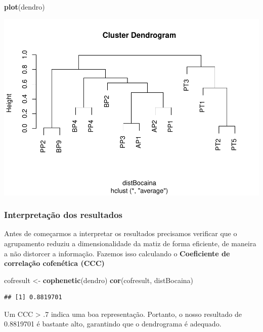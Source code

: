 \documentclass[
]{book}
\newenvironment{Shaded}{\begin{snugshade}}{\end{snugshade}}
\newcommand{\KeywordTok}[1]{\textcolor[rgb]{0.13,0.29,0.53}{\textbf{#1}}}
\newcommand{\NormalTok}[1]{#1}
\newcommand{\StringTok}[1]{\textcolor[rgb]{0.31,0.60,0.02}{#1}}
\begin{document}
\begin{Shaded}
\begin{Highlighting}[]
\KeywordTok{plot}\NormalTok{(dendro)}
\end{Highlighting}
\end{Shaded}

\includegraphics{livro_r_ecologia_files/figure-latex/unnamed-chunk-25-1.pdf}

\hypertarget{interpretauxe7uxe3o-dos-resultados}{%
\subsubsection{Interpretação dos resultados}\label{interpretauxe7uxe3o-dos-resultados}}

Antes de começarmos a interpretar os resultados precisamos verificar que o agrupamento reduziu a dimensionalidade da matiz de forma eficiente, de maneira a não distorcer a informação. Fazemos isso calculando o \textbf{Coeficiente de correlação cofenética (CCC)}

\begin{Shaded}
\begin{Highlighting}[]
\NormalTok{cofresult <-}\StringTok{ }\KeywordTok{cophenetic}\NormalTok{(dendro)}
\KeywordTok{cor}\NormalTok{(cofresult, distBocaina)}
\end{Highlighting}
\end{Shaded}

\begin{verbatim}
## [1] 0.8819701
\end{verbatim}

Um CCC \textgreater{} .7 indica uma boa representação. Portanto, o nosso resultado de 0.8819701 é bastante alto, garantindo que o dendrograma é adequado.
\end{document}
